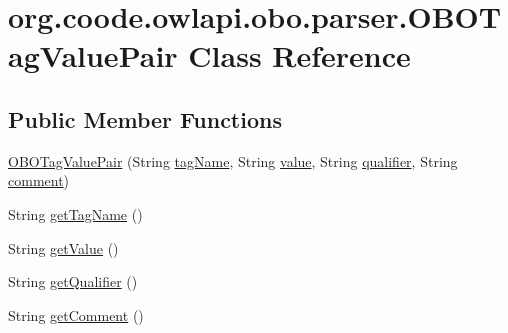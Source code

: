 \hypertarget{classorg_1_1coode_1_1owlapi_1_1obo_1_1parser_1_1_o_b_o_tag_value_pair}{\section{org.\-coode.\-owlapi.\-obo.\-parser.\-O\-B\-O\-Tag\-Value\-Pair Class Reference}
\label{classorg_1_1coode_1_1owlapi_1_1obo_1_1parser_1_1_o_b_o_tag_value_pair}
}
\subsection*{Public Member Functions}
\begin{DoxyCompactItemize}
\item 
\hyperlink{classorg_1_1coode_1_1owlapi_1_1obo_1_1parser_1_1_o_b_o_tag_value_pair_aa208cb0bd7c287457ee7b17ea2919b79}{O\-B\-O\-Tag\-Value\-Pair} (String \hyperlink{classorg_1_1coode_1_1owlapi_1_1obo_1_1parser_1_1_o_b_o_tag_value_pair_ab47c18bfb20583744bc64ab1a87c1f07}{tag\-Name}, String \hyperlink{classorg_1_1coode_1_1owlapi_1_1obo_1_1parser_1_1_o_b_o_tag_value_pair_a468a379caaef83e65126994bf1646a69}{value}, String \hyperlink{classorg_1_1coode_1_1owlapi_1_1obo_1_1parser_1_1_o_b_o_tag_value_pair_ac3efd04f616a974236a958257e52dfdd}{qualifier}, String \hyperlink{classorg_1_1coode_1_1owlapi_1_1obo_1_1parser_1_1_o_b_o_tag_value_pair_a0c39977841506c7e98435602f029bd7c}{comment})
\item 
String \hyperlink{classorg_1_1coode_1_1owlapi_1_1obo_1_1parser_1_1_o_b_o_tag_value_pair_a95e7b59a607c4fba911c3e26daec9ec3}{get\-Tag\-Name} ()
\item 
String \hyperlink{classorg_1_1coode_1_1owlapi_1_1obo_1_1parser_1_1_o_b_o_tag_value_pair_a33e2c30c319538b78c134b2c580f9fc9}{get\-Value} ()
\item 
String \hyperlink{classorg_1_1coode_1_1owlapi_1_1obo_1_1parser_1_1_o_b_o_tag_value_pair_af3e02314b9a158d4cefcf0c63f98da4d}{get\-Qualifier} ()
\item 
String \hyperlink{classorg_1_1coode_1_1owlapi_1_1obo_1_1parser_1_1_o_b_o_tag_value_pair_abe3e5af6022af8c0377f7f1da5e893ae}{get\-Comment} ()
\end{DoxyCompactItemize}
